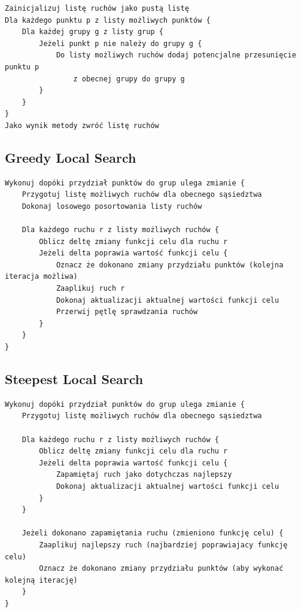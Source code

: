 \documentclass[main.tex]{subfiles}
\begin{document}
\begin{verbatim}
Zainicjalizuj listę ruchów jako pustą listę
Dla każdego punktu p z listy możliwych punktów {
    Dla każdej grupy g z listy grup {
        Jeżeli punkt p nie należy do grupy g {
            Do listy możliwych ruchów dodaj potencjalne przesunięcie punktu p
                z obecnej grupy do grupy g
        }
    }
}
Jako wynik metody zwróć listę ruchów
\end{verbatim}

\subsection{Greedy Local Search}
\begin{verbatim}
Wykonuj dopóki przydział punktów do grup ulega zmianie {
    Przygotuj listę możliwych ruchów dla obecnego sąsiedztwa
    Dokonaj losowego posortowania listy ruchów

    Dla każdego ruchu r z listy możliwych ruchów {
        Oblicz deltę zmiany funkcji celu dla ruchu r
        Jeżeli delta poprawia wartość funkcji celu {
            Oznacz że dokonano zmiany przydziału punktów (kolejna iteracja możliwa)
            Zaaplikuj ruch r
            Dokonaj aktualizacji aktualnej wartości funkcji celu
            Przerwij pętlę sprawdzania ruchów
        }
    }
}
\end{verbatim}

\subsection{Steepest Local Search}
\begin{verbatim}
Wykonuj dopóki przydział punktów do grup ulega zmianie {
    Przygotuj listę możliwych ruchów dla obecnego sąsiedztwa

    Dla każdego ruchu r z listy możliwych ruchów {
        Oblicz deltę zmiany funkcji celu dla ruchu r
        Jeżeli delta poprawia wartość funkcji celu {
            Zapamiętaj ruch jako dotychczas najlepszy
            Dokonaj aktualizacji aktualnej wartości funkcji celu
        }
    }

    Jeżeli dokonano zapamiętania ruchu (zmieniono funkcję celu) {
        Zaaplikuj najlepszy ruch (najbardziej poprawiajacy funkcję celu)
        Oznacz że dokonano zmiany przydziału punktów (aby wykonać kolejną iterację)
    }
}
\end{verbatim}
\end{document}
